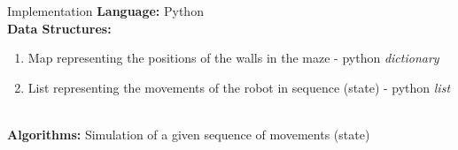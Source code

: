 


\begin{frame}{Implementation}
    \textbf{Language:} Python \\
    \textbf{Data Structures:} 
    \begin{enumerate}
        \item Map representing the positions of the walls in the maze - python \textit{dictionary}
        \item List representing the movements of the robot in sequence (state) - python \textit{list}
    \end{enumerate}\\
    \textbf{Algorithms:} Simulation of a given sequence of movements (state)\\
\end{frame}
